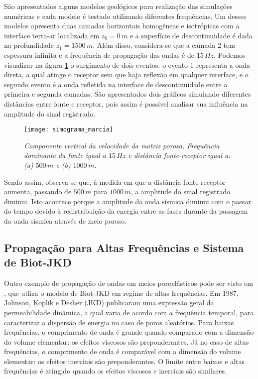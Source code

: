 S\~ao apresentados alguns modelos geol\'ogicos para realiza\c{c}\~ao das simula\c{c}\~oes num\'ericas e cada modelo \'e testado utilizando diferentes frequ\^encias. Um desses modelos apresenta duas camadas horizontais homog\^eneas e isotr\'opicas com a interface terra-ar localizada em $z_0=0\,m$  e a superf\'icie de descontinuidade \'e dada na profundidade $z_1=1500\,m$. Al\'em disso,
considera-se que a camada 2 tem espessura infinita e a frequ\^encia de propaga\c{c}\~ao das ondas \'e de $15\,Hz$. Podemos visualizar na figura \ref{fig.marcia} o surgimento de dois eventos: o evento 1 representa a onda direta, a qual atinge o receptor sem que haja reflex\~ao em qualquer interface, e o segundo evento \'e a onda refletida na interface de descontinuidade entre a primeira e segunda camadas. S\~ao apresentados dois gr\'aficos simulando diferentes dist\^ancias entre fonte e receptor, pois assim \'e poss\'ivel analisar sua influ\^encia na amplitude do sinal registrado.
\begin{figure}
\centering
\texttt{[image: simograma\_marcia]}
\caption{\textit{Componente vertical da velocidade da matriz porosa. Frequ\^encia dominante da fonte igual a $15\,Hz$ e dist\^ancia fonte-receptor igual a: (a) $500\,m$ e (b) $1000\,m$.}}
\label{fig.marcia}
\end{figure}


Sendo assim, observa-se que, \`a medida em que a dist\^ancia fonte-receptor aumenta, passando de $500\,m$ para $1000\,m$, a amplitude do sinal registrado diminui. Isto acontece porque a amplitude da onda s\'ismica diminui com o passar do tempo devido \`a redistribui\c{c}\~ao da energia entre as fases durante da passagem da onda s\'ismica atrav\'es de meio poroso. 

\subsection{Propaga\c{c}\~ao para Altas Frequ\^encias e Sistema de Biot-JKD}\label{sec.biot-jkd}

Outro exemplo de propaga\c{c}\~ao de ondas em meios poroel\'asticos pode ser visto em \cite{miranda_2016}, que utliza o modelo de Biot-JKD em regime de altas frequ\^encias. Em 1987, Johnson, Koplik e Desher (JKD) publicaram uma express\~ao geral da permeabilidade din\^amica, a qual varia de acordo com a frequ\^encia temporal, para caracterizar a dispers\~ao de energia no caso de poros aleat\'orios. Para baixas frequ\^encias, o comprimento de onda \'e grande quando comparado com a dimens\~ao do volume elementar: os efeitos viscosos s\~ao
preponderantes. J\'a no caso de altas frequ\^encias, o comprimento de onda \'e compar\'avel com a dimens\~ao do volume elementar: os efeitos inerciais s\~ao preponderantes. O limite entre baixas e altas frequ\^encias \'e atingido quando os efeitos viscosos e inerciais s\~ao similares.

